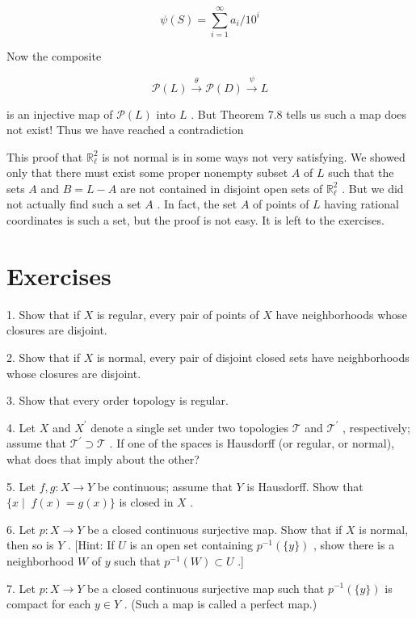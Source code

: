 \documentclass[10pt]{article}
\begin{document}
\[
\psi \left( S\right)  = \mathop{\sum }\limits_{{i = 1}}^{\infty }{a}_{i}/{10}^{i}
\]

Now the composite

\[
\mathcal{P}\left( L\right) \overset{\theta }{ \rightarrow  }\mathcal{P}\left( D\right) \overset{\psi }{ \rightarrow  }L
\]

is an injective map of \(\mathcal{P}\left( L\right)\) into \(L\) . But Theorem 7.8 tells us such a map does not exist! Thus we have reached a contradiction

This proof that \({\mathbb{R}}_{\ell }^{2}\) is not normal is in some ways not very satisfying. We showed only that there must exist some proper nonempty subset \(A\) of \(L\) such that the sets \(A\) and \(B = L - A\) are not contained in disjoint open sets of \({\mathbb{R}}_{\ell }^{2}\) . But we did not actually find such a set \(A\) . In fact, the set \(A\) of points of \(L\) having rational coordinates is such a set, but the proof is not easy. It is left to the exercises.

\section*{Exercises}

1. Show that if \(X\) is regular, every pair of points of \(X\) have neighborhoods whose closures are disjoint.

2. Show that if \(X\) is normal, every pair of disjoint closed sets have neighborhoods whose closures are disjoint.

3. Show that every order topology is regular.

4. Let \(X\) and \({X}^{\prime }\) denote a single set under two topologies \(\mathcal{T}\) and \({\mathcal{T}}^{\prime }\) , respectively; assume that \({\mathcal{T}}^{\prime } \supset  \mathcal{T}\) . If one of the spaces is Hausdorff (or regular, or normal), what does that imply about the other?

5. Let \(f,g : X \rightarrow  Y\) be continuous; assume that \(Y\) is Hausdorff. Show that \(\{ x \mid \; f\left( x\right)  = g\left( x\right) \}\) is closed in \(X\) .

6. Let \(p : X \rightarrow  Y\) be a closed continuous surjective map. Show that if \(X\) is normal, then so is \(Y\) . [Hint: If \(U\) is an open set containing \({p}^{-1}\left( {\{ y\} }\right)\) , show there is a neighborhood \(W\) of \(y\) such that \({p}^{-1}\left( W\right)  \subset  U\) .]

7. Let \(p : X \rightarrow  Y\) be a closed continuous surjective map such that \({p}^{-1}\left( {\{ y\} }\right)\) is compact for each \(y \in  Y\) . (Such a map is called a perfect map.)
\end{document}

